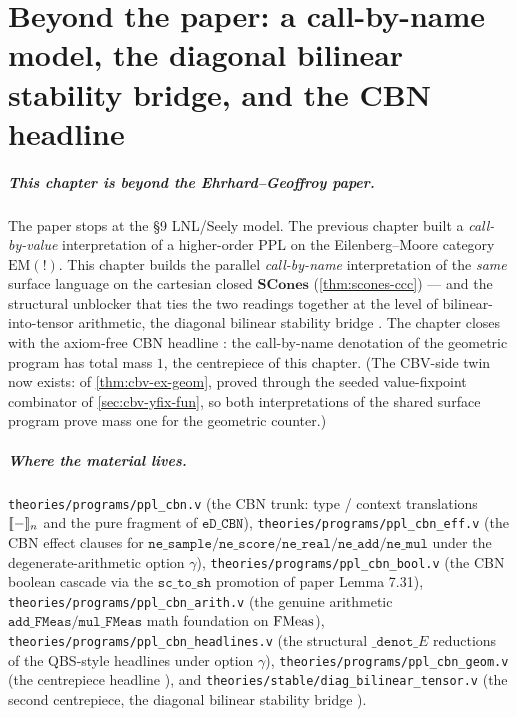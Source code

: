 \chapter{Beyond the paper: a call-by-name model, the diagonal bilinear
stability bridge, and the CBN headline}\label{ch:cbn}

\paragraph{This chapter is beyond the Ehrhard--Geoffroy paper.}
The paper stops at the \S9 LNL/Seely model. The previous chapter built a
\emph{call-by-value} interpretation of a higher-order PPL on the
Eilenberg--Moore category $\mathrm{EM}(\mathord{!})$. This chapter builds
the parallel \emph{call-by-name} interpretation of the \emph{same}
surface language on the cartesian closed $\mathbf{SCones}$
(\autoref{thm:scones-ccc}) --- and the structural unblocker that ties
the two readings together at the level of bilinear-into-tensor
arithmetic, the diagonal bilinear stability bridge
.
The chapter closes with the axiom-free CBN headline
: the call-by-name
denotation of the geometric program has total mass $1$, the
centrepiece of this chapter. (The CBV-side twin now exists:
 of
\autoref{thm:cbv-ex-geom}, proved through the seeded value-fixpoint
combinator of \autoref{sec:cbv-yfix-fun}, so both interpretations of
the shared surface program prove mass one for the geometric counter.)

\paragraph{Where the material lives.}
\texttt{theories/programs/ppl\_cbn.v} (the CBN trunk: type / context
translations $[\![ - ]\!]_n$ and the pure fragment of $\mathtt{eD\_CBN}$),
\texttt{theories/programs/ppl\_cbn\_eff.v} (the CBN effect clauses for
$\mathtt{ne\_sample}/\mathtt{ne\_score}/\mathtt{ne\_real}/\mathtt{ne\_add}
/\mathtt{ne\_mul}$ under the degenerate-arithmetic option $\gamma$),
\texttt{theories/programs/ppl\_cbn\_bool.v} (the CBN boolean cascade
via the $\texttt{sc\_to\_sh}$ promotion of paper Lemma 7.31),
\texttt{theories/programs/ppl\_cbn\_arith.v} (the genuine arithmetic
$\mathtt{add\_FMeas}/\mathtt{mul\_FMeas}$ math foundation on
$\mathrm{FMeas}$), \texttt{theories/programs/ppl\_cbn\_headlines.v} (the
structural $\_\mathtt{denot}\_E$ reductions of the QBS-style headlines
under option $\gamma$),
\texttt{theories/programs/ppl\_cbn\_geom.v} (the centrepiece headline
), and
\texttt{theories/stable/diag\_bilinear\_tensor.v} (the second centrepiece,
the diagonal bilinear stability bridge
).

